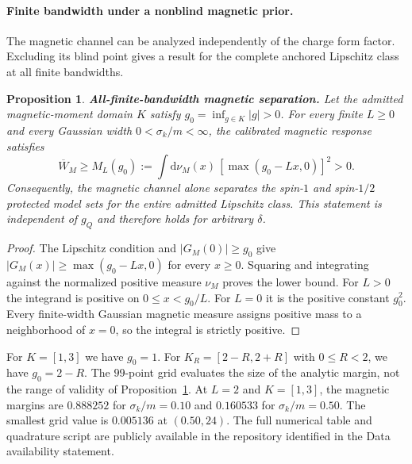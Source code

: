 \documentclass[12pt]{iopjournal}
\newcommand{\dd}{\mathrm d}
\newtheorem{proposition}{Proposition}[section]
\theoremstyle{definition}
\theoremstyle{remark}
\begin{document}
\paragraph{Finite bandwidth under a nonblind magnetic prior.}
The magnetic channel can be analyzed independently of the charge form factor. Excluding its blind point gives a result for the complete anchored Lipschitz class at all finite bandwidths.

\begin{proposition}
\textbf{All-finite-bandwidth magnetic separation.}
\label{prop:magnetic-all-width}
Let the admitted magnetic-moment domain $K$ satisfy $g_0=\inf_{g\in K}|g|>0$. For every finite $L\ge0$ and every Gaussian width $0<\sigma_k/m<\infty$, the calibrated magnetic response satisfies
\begin{equation}
\boxed{\overline W_M\ge M_L(g_0):=\int\dd\nu_M(x)\,[\max(g_0-Lx,0)]^2>0.}
\label{eq:compact-magnetic-margin}
\end{equation}
Consequently, the magnetic channel alone separates the spin-$1$ and spin-$1/2$ protected model sets for the entire admitted Lipschitz class. This statement is independent of $g_Q$ and therefore holds for arbitrary $\delta$.
\end{proposition}
\begin{proof}
The Lipschitz condition and $|G_M(0)|\ge g_0$ give $|G_M(x)|\ge\max(g_0-Lx,0)$ for every $x\ge0$. Squaring and integrating against the normalized positive measure $\nu_M$ proves the lower bound. For $L>0$ the integrand is positive on $0\le x<g_0/L$. For $L=0$ it is the positive constant $g_0^2$. Every finite-width Gaussian magnetic measure assigns positive mass to a neighborhood of $x=0$, so the integral is strictly positive.
\end{proof}

For $K=[1,3]$ we have $g_0=1$. For $K_R=[2-R,2+R]$ with $0\le R<2$, we have $g_0=2-R$. The $99$-point grid evaluates the size of the analytic margin, not the range of validity of Proposition~\ref{prop:magnetic-all-width}. At $L=2$ and $K=[1,3]$, the magnetic margins are $0.888252$ for $\sigma_k/m=0.10$ and $0.160533$ for $\sigma_k/m=0.50$. The smallest grid value is $0.005136$ at $(0.50,24)$. The full numerical table and quadrature script are publicly available in the repository identified in the Data availability statement.
\end{document}
